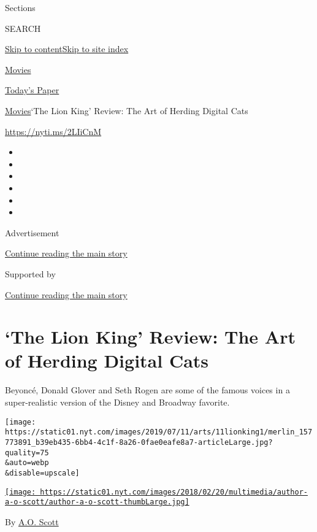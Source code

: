 Sections

SEARCH

\protect\hyperlink{site-content}{Skip to
content}\protect\hyperlink{site-index}{Skip to site index}

\href{https://www.nytimes.com/section/movies}{Movies}

\href{https://myaccount.nytimes.com/auth/login?response_type=cookie\&client_id=vi}{}

\href{https://www.nytimes.com/section/todayspaper}{Today's Paper}

\href{/section/movies}{Movies}\textbar{}`The Lion King' Review: The Art
of Herding Digital Cats

\url{https://nyti.ms/2LIiCnM}

\begin{itemize}
\item
\item
\item
\item
\item
\item
\end{itemize}

Advertisement

\protect\hyperlink{after-top}{Continue reading the main story}

Supported by

\protect\hyperlink{after-sponsor}{Continue reading the main story}

\hypertarget{the-lion-king-review-the-art-of-herding-digital-cats}{%
\section{`The Lion King' Review: The Art of Herding Digital
Cats}\label{the-lion-king-review-the-art-of-herding-digital-cats}}

Beyoncé, Donald Glover and Seth Rogen are some of the famous voices in a
super-realistic version of the Disney and Broadway favorite.

\texttt{[image: https://static01.nyt.com/images/2019/07/11/arts/11lionking1/merlin\_157773891\_b39eb435-6bb4-4c1f-8a26-0fae0eafe8a7-articleLarge.jpg?quality=75\\\&auto=webp\\\&disable=upscale]}

\href{https://www.nytimes.com/by/a-o--scott}{\texttt{[image: https://static01.nyt.com/images/2018/02/20/multimedia/author-a-o-scott/author-a-o-scott-thumbLarge.jpg]}}

By \href{https://www.nytimes.com/by/a-o--scott}{A.O. Scott}

